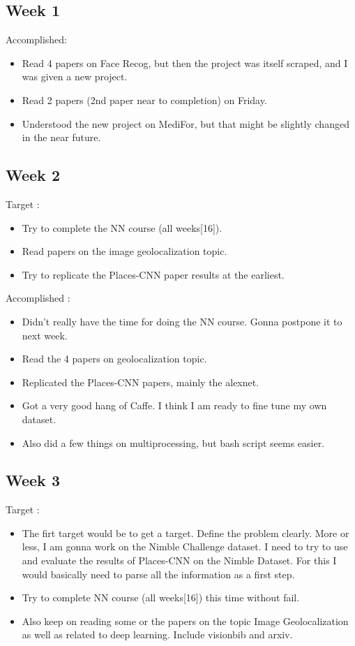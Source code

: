 \documentclass{article}
\begin{document}
\subsection{Week 1}
Accomplished:
\begin{itemize}
\item Read 4 papers on Face Recog, but then the project was itself scraped, and I was given a new project.
\item Read 2 papers (2nd paper near to completion) on Friday.
\item Understood the new project on MediFor, but that might be slightly changed in the near future.
\end{itemize}


\subsection{Week 2}
Target :
\begin{itemize}
\item Try to complete the NN course (all weeks[16]).
\item Read papers on the image geolocalization topic.
\item Try to replicate the Places-CNN paper results at the earliest.
\end{itemize}

Accomplished :
\begin{itemize}
\item Didn't really have the time for doing the NN course. Gonna postpone it to next week.
\item Read the 4 papers on geolocalization topic.
\item Replicated the Places-CNN papers, mainly the alexnet.
\item Got a very good hang of Caffe. I think I am ready to fine tune my own dataset.
\item Also did a few things on multiprocessing, but bash script seems easier.
\end{itemize}

\subsection{Week 3}
Target :
\begin{itemize}
\item The firt target would be to get a target. Define the problem clearly. More or less, I am gonna work on the Nimble Challenge dataset. I need to try to use and evaluate the results of Places-CNN on the Nimble Dataset. For this I would basically need to parse all the information as a first step.
\item Try to complete NN course (all weeks[16]) this time without fail.
\item Also keep on reading some or the papers on the topic Image Geolocalization as well as related to deep learning. Include visionbib and arxiv.
\end{itemize}
\end{document}
